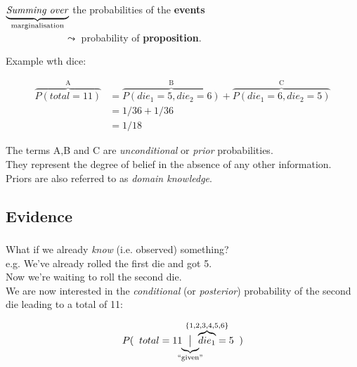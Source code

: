 \begin{frame}

$\underbrace{\text{\emph{Summing over}}}_{\text{marginalisation}}$ the probabilities of the \textbf{events} \\
$\qquad\qquad\qquad\leadsto$ probability of \textbf{proposition}.\\

\pause

Example wth dice:

\begin{align}
\overbrace{P({total} = 11)}^{\text{A}} &= \overbrace{P({die}_{1} = 5, {die}_{2} = 6)}^{\text{B}} + \overbrace{P({die}_{1} = 6, {die}_{2} = 5)}^{\text{C}}\\
        &= 1 / 36 + 1/36\\
        &= 1/18
\end{align}

The terms A,B and C are \emph{unconditional} or \emph{prior} probabilities.\\
They represent the degree of belief in the absence of any other information.\\
Priors are also referred to as \emph{domain knowledge}.
        
\end{frame}

\subsection{Evidence}

\begin{frame}\frametitle{\subsecname}

What if we already \emph{know} (i.e. observed) something?\\

e.g. We've already rolled the first die and got 5.\\
Now we're waiting to roll the second die.\\

We are now interested in the \emph{conditional} (or \emph{posterior}) probability of the second die leading to a total of 11:

\begin{equation}
P(\;\;{total}= 11 \kern-1.5ex  \underbrace{\big| }_{\text{``given''}} \kern-1.5ex \overbrace{{die}_{1}}^{\mathclap{\{1,2,3,4,5,6\}}} = 5\;\;)
\end{equation}

\end{frame}

